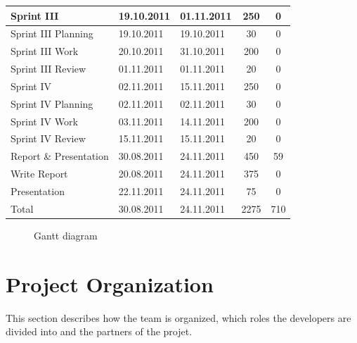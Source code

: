\begin{table}[!htb]
\begin{tabular}{l l l c c}
	\midrule
	Sprint III & 19.10.2011 & 01.11.2011 & 250 & 0 \\
	\midrule
	Sprint III Planning & 19.10.2011 & 19.10.2011 & 30 & 0 \\
	Sprint III Work & 20.10.2011 & 31.10.2011 & 200 & 0 \\
	Sprint III Review & 01.11.2011 & 01.11.2011 & 20 & 0 \\
	\midrule
	Sprint IV & 02.11.2011 & 15.11.2011 & 250 & 0 \\
	\midrule
	Sprint IV Planning & 02.11.2011 & 02.11.2011 & 30 & 0 \\
	Sprint IV Work & 03.11.2011 & 14.11.2011 & 200 & 0 \\
	Sprint IV Review & 15.11.2011 & 15.11.2011 & 20 & 0 \\
	\midrule
	Report \& Presentation & 30.08.2011 & 24.11.2011 & 450 & 59 \\
	\midrule
	Write Report & 20.08.2011 & 24.11.2011 & 375 & 0 \\
	Presentation & 22.11.2011 & 24.11.2011 & 75 & 0 \\
	\midrule
	Total & 30.08.2011 & 24.11.2011 & 2275 & 710 \\
	\bottomrule
\end{tabular}
\end{table}

\begin{figure}[!htb]
	\noindent{}
	\caption{Gantt diagram\label{fig:gantt}}
\end{figure}


\section{Project Organization}
This section describes how the team is organized, which roles the developers are divided into and the partners of the projet.

